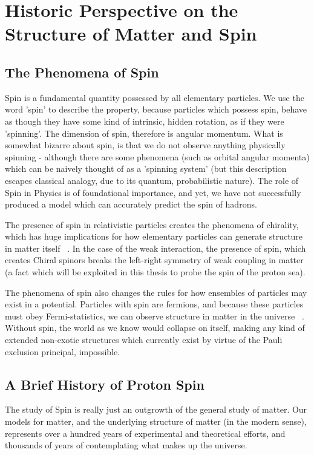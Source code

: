 \chapter{Historic Perspective on the Structure of Matter and Spin}
\section{The Phenomena of Spin}

Spin is a fundamental quantity possessed by all elementary particles. We use
the word 'spin' to describe the property, because particles which possess spin,
behave as though they have some kind of intrinsic, hidden rotation, as if they
were 'spinning'. The dimension of spin, therefore is angular momentum. What is
somewhat bizarre about spin, is that we do not observe anything physically
spinning - although there are some phenomena (such as orbital angular momenta)
which can be naively thought of as a 'spinning system' (but this description
escapes classical analogy, due to its quantum, probabilistic nature). The role
of Spin in Physics is of foundational importance, and yet, we have not
successfully produced a model which can accurately predict the spin of hadrons.

The presence of spin in relativistic particles creates the phenomena of
chirality, which has huge implications for how elementary particles can generate
structure in matter itself ~\needcite{}. In the case of the weak interaction,
the presence of spin, which creates Chiral spinors breaks the left-right
symmetry of weak coupling in matter (a fact which will be exploited in this
thesis to probe the spin of the proton sea).

The phenomena of spin also changes the rules for how ensembles of particles may
exist in a potential. Particles with spin are fermions, and because these
particles must obey Fermi-statistics, we can observe structure in matter in the
universe ~\needcite{}. Without spin, the world as we know would collapse on
itself, making any kind of extended non-exotic structures which currently exist
by virtue of the Pauli exclusion principal, impossible.

\clearpage
\section{A Brief History of Proton Spin}

The study of Spin is really just an outgrowth of the general study of matter.
Our models for matter, and the underlying structure of matter (in the modern
sense), represents over a hundred years of experimental and theoretical efforts,
and thousands of years of contemplating what makes up the universe.

